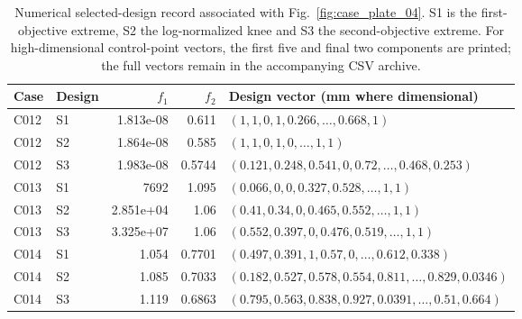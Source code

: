 \begin{table}[p]
\centering\scriptsize
\caption{Numerical selected-design record associated with Fig.~\ref{fig:case_plate_04}. S1 is the first-objective extreme, S2 the log-normalized knee and S3 the second-objective extreme. For high-dimensional control-point vectors, the first five and final two components are printed; the full vectors remain in the accompanying CSV archive.}
\label{tab:case_plate_04}
\setlength{\tabcolsep}{3.2pt}
\begin{tabularx}{\textwidth}{llrr>{\raggedright\arraybackslash}X}
\toprule Case & Design & $f_1$ & $f_2$ & Design vector (mm where dimensional) \\
\midrule
C012 & S1 & 1.813e-08 & 0.611 & $(1, 1, 0, 1, 0.266, \ldots, 0.668, 1)$ \\
C012 & S2 & 1.864e-08 & 0.585 & $(1, 1, 0, 1, 0, \ldots, 1, 1)$ \\
C012 & S3 & 1.983e-08 & 0.5744 & $(0.121, 0.248, 0.541, 0, 0.72, \ldots, 0.468, 0.253)$ \\
C013 & S1 & 7692 & 1.095 & $(0.066, 0, 0, 0.327, 0.528, \ldots, 1, 1)$ \\
C013 & S2 & 2.851e+04 & 1.06 & $(0.41, 0.34, 0, 0.465, 0.552, \ldots, 1, 1)$ \\
C013 & S3 & 3.325e+07 & 1.06 & $(0.552, 0.397, 0, 0.476, 0.519, \ldots, 1, 1)$ \\
C014 & S1 & 1.054 & 0.7701 & $(0.497, 0.391, 1, 0.57, 0, \ldots, 0.612, 0.338)$ \\
C014 & S2 & 1.085 & 0.7033 & $(0.182, 0.527, 0.578, 0.554, 0.811, \ldots, 0.829, 0.0346)$ \\
C014 & S3 & 1.119 & 0.6863 & $(0.795, 0.563, 0.838, 0.927, 0.0391, \ldots, 0.51, 0.664)$ \\
\bottomrule
\end{tabularx}
\end{table}
